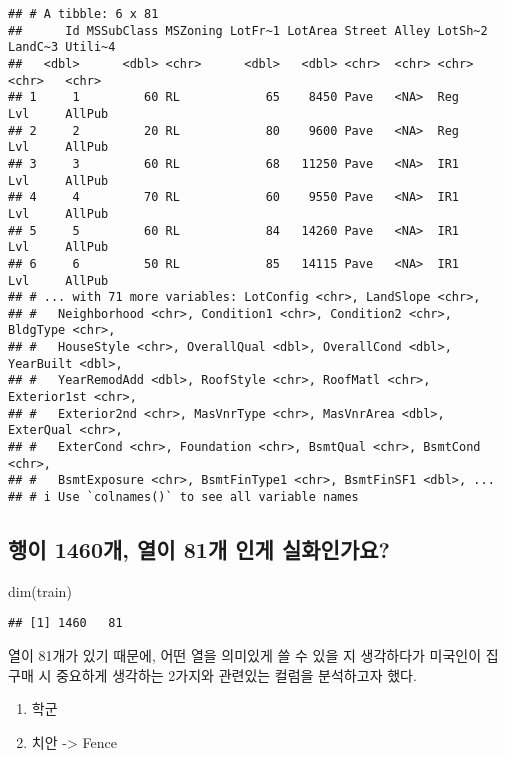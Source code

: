 \documentclass[
]{article}
\newenvironment{Shaded}{\begin{snugshade}}{\end{snugshade}}
\newcommand{\FunctionTok}[1]{\textcolor[rgb]{0.00,0.00,0.00}{#1}}
\newcommand{\NormalTok}[1]{#1}
\providecommand{\tightlist}{%
  \setlength{\itemsep}{0pt}\setlength{\parskip}{0pt}}
\begin{document}
\begin{verbatim}
## # A tibble: 6 x 81
##      Id MSSubClass MSZoning LotFr~1 LotArea Street Alley LotSh~2 LandC~3 Utili~4
##   <dbl>      <dbl> <chr>      <dbl>   <dbl> <chr>  <chr> <chr>   <chr>   <chr>  
## 1     1         60 RL            65    8450 Pave   <NA>  Reg     Lvl     AllPub 
## 2     2         20 RL            80    9600 Pave   <NA>  Reg     Lvl     AllPub 
## 3     3         60 RL            68   11250 Pave   <NA>  IR1     Lvl     AllPub 
## 4     4         70 RL            60    9550 Pave   <NA>  IR1     Lvl     AllPub 
## 5     5         60 RL            84   14260 Pave   <NA>  IR1     Lvl     AllPub 
## 6     6         50 RL            85   14115 Pave   <NA>  IR1     Lvl     AllPub 
## # ... with 71 more variables: LotConfig <chr>, LandSlope <chr>,
## #   Neighborhood <chr>, Condition1 <chr>, Condition2 <chr>, BldgType <chr>,
## #   HouseStyle <chr>, OverallQual <dbl>, OverallCond <dbl>, YearBuilt <dbl>,
## #   YearRemodAdd <dbl>, RoofStyle <chr>, RoofMatl <chr>, Exterior1st <chr>,
## #   Exterior2nd <chr>, MasVnrType <chr>, MasVnrArea <dbl>, ExterQual <chr>,
## #   ExterCond <chr>, Foundation <chr>, BsmtQual <chr>, BsmtCond <chr>,
## #   BsmtExposure <chr>, BsmtFinType1 <chr>, BsmtFinSF1 <dbl>, ...
## # i Use `colnames()` to see all variable names
\end{verbatim}

\hypertarget{uxd589uxc774-1460uxac1c-uxc5f4uxc774-81uxac1c-uxc778uxac8c-uxc2e4uxd654uxc778uxac00uxc694}{%
\subsection{행이 1460개, 열이 81개 인게
실화인가요?}\label{uxd589uxc774-1460uxac1c-uxc5f4uxc774-81uxac1c-uxc778uxac8c-uxc2e4uxd654uxc778uxac00uxc694}}

\begin{Shaded}
\begin{Highlighting}[]
\FunctionTok{dim}\NormalTok{(train)}
\end{Highlighting}
\end{Shaded}

\begin{verbatim}
## [1] 1460   81
\end{verbatim}

열이 81개가 있기 때문에, 어떤 열을 의미있게 쓸 수 있을 지 생각하다가
미국인이 집 구매 시 중요하게 생각하는 2가지와 관련있는 컬럼을 분석하고자
했다.

\begin{enumerate}
\def\labelenumi{\arabic{enumi}.}
\tightlist
\item
  학군
\item
  치안 -\textgreater{} Fence
\end{enumerate}
\end{document}
